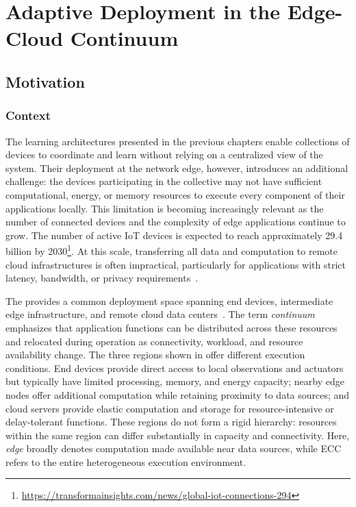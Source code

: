 
\chapter{Adaptive Deployment in the Edge-Cloud Continuum}
\label{chap:tasksplacement}
\minitoc


\section{Motivation}\label{sec:motivation}

\subsection{Context}
The learning architectures presented in the previous chapters 
 enable collections of devices to coordinate 
 and learn without relying on a centralized view of the system.
%
Their deployment at the network edge, however, 
 introduces an additional challenge:
 the devices participating in the collective may not have sufficient computational, 
 energy, or memory resources to execute every component of their applications locally.
%
This limitation is becoming increasingly relevant as the number of connected devices 
 and the complexity of edge applications continue to grow.
%
The number of active IoT devices is expected to reach approximately 29.4 billion 
 by 2030\footnote{\url{https://transformainsights.com/news/global-iot-connections-294}}.
%
At this scale, 
 transferring all data and computation to remote cloud infrastructures is often impractical, 
 particularly for applications with strict latency, bandwidth, 
 or privacy requirements~\cite{DBLP:journals/computer/Satyanarayanan17}.

The  provides a common deployment space spanning end devices,
 intermediate edge infrastructure, and remote cloud data centers~\cite{DBLP:journals/jpdc/RosendoCVA22}.
%
The term \emph{continuum} emphasizes that application functions can be distributed across these resources
 and relocated during operation as connectivity, workload, and resource availability change.
%
The three regions shown in  offer different execution conditions.
%
End devices provide direct access to local observations and actuators but typically have limited processing,
 memory, and energy capacity; nearby edge nodes offer additional computation while retaining proximity to data sources;
 and cloud servers provide elastic computation and storage for resource-intensive or delay-tolerant functions.
%
These regions do not form a rigid hierarchy:
 resources within the same region can differ substantially in capacity and connectivity.
%
Here, \emph{edge} broadly denotes computation made available near data sources,
 while \gls{ECC} refers to the entire heterogeneous execution environment.

